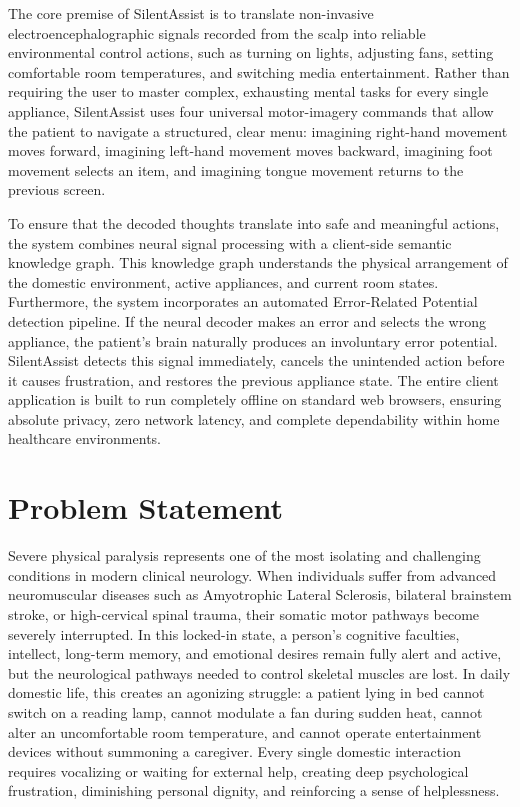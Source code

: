 \documentclass[12pt,a4paper]{report}
\begin{document}
The core premise of SilentAssist is to translate non-invasive electroencephalographic signals recorded from the scalp into reliable environmental control actions, such as turning on lights, adjusting fans, setting comfortable room temperatures, and switching media entertainment. Rather than requiring the user to master complex, exhausting mental tasks for every single appliance, SilentAssist uses four universal motor-imagery commands that allow the patient to navigate a structured, clear menu: imagining right-hand movement moves forward, imagining left-hand movement moves backward, imagining foot movement selects an item, and imagining tongue movement returns to the previous screen.

To ensure that the decoded thoughts translate into safe and meaningful actions, the system combines neural signal processing with a client-side semantic knowledge graph. This knowledge graph understands the physical arrangement of the domestic environment, active appliances, and current room states. Furthermore, the system incorporates an automated Error-Related Potential detection pipeline. If the neural decoder makes an error and selects the wrong appliance, the patient's brain naturally produces an involuntary error potential. SilentAssist detects this signal immediately, cancels the unintended action before it causes frustration, and restores the previous appliance state. The entire client application is built to run completely offline on standard web browsers, ensuring absolute privacy, zero network latency, and complete dependability within home healthcare environments.

\section{Problem Statement}
Severe physical paralysis represents one of the most isolating and challenging conditions in modern clinical neurology. When individuals suffer from advanced neuromuscular diseases such as Amyotrophic Lateral Sclerosis, bilateral brainstem stroke, or high-cervical spinal trauma, their somatic motor pathways become severely interrupted. In this locked-in state, a person's cognitive faculties, intellect, long-term memory, and emotional desires remain fully alert and active, but the neurological pathways needed to control skeletal muscles are lost. In daily domestic life, this creates an agonizing struggle: a patient lying in bed cannot switch on a reading lamp, cannot modulate a fan during sudden heat, cannot alter an uncomfortable room temperature, and cannot operate entertainment devices without summoning a caregiver. Every single domestic interaction requires vocalizing or waiting for external help, creating deep psychological frustration, diminishing personal dignity, and reinforcing a sense of helplessness.
\end{document}
